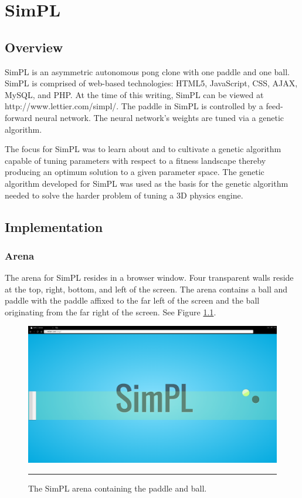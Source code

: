 \chapter{SimPL}

\label{Chapter3}

\section{Overview}


SimPL is an asymmetric autonomous pong clone with one paddle and one ball. SimPL is comprised of web-based technologies: HTML5, JavaScript, CSS, AJAX, MySQL, and PHP. At the time of this writing, SimPL can be viewed at http://www.lettier.com/simpl/. The paddle in SimPL is controlled by a feed-forward neural network. The neural network's weights are tuned via a genetic algorithm. 

The focus for SimPL was to learn about and to cultivate a genetic algorithm capable of tuning parameters with respect to a fitness landscape thereby producing an optimum solution to a given parameter space. The genetic algorithm developed for SimPL was used as the basis for the genetic algorithm needed to solve the harder problem of tuning a 3D physics engine. 

\section{Implementation}

\subsection{Arena}

The arena for SimPL resides in a browser window. Four transparent walls reside at the top, right, bottom, and left of the screen. The arena contains a ball and paddle with the paddle affixed to the far left of the screen and the ball originating from the far right of the screen. See Figure \ref{fig:arena}.

\begin{figure}[htbp]  
  \centering
  \includegraphics[scale=0.2]{../Figures/Chapter3/arena.png}
  \rule{35em}{0.5pt}
  \caption[SimPL Arena]{The SimPL arena containing the paddle and ball.}
  \label{fig:arena}
\end{figure}

